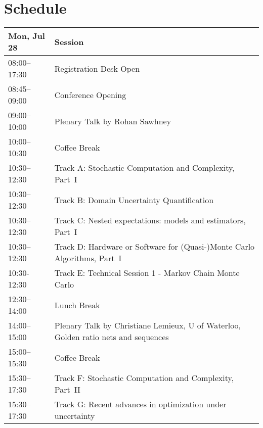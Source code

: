 \chapter{Schedule}
\begin{table}
{\footnotesize
\begin{tabularx}{\textwidth}{>{\hsize=0.32\hsize}X|>{\hsize=1.7\hsize}X}
\hline
\textbf{Mon, Jul 28} & \textbf{Session} \\
\hline
\cellcolor{\EmptyColor}08:00–17:30 & \cellcolor{\EmptyColor}Registration Desk Open \\
\cellcolor{\PlenaryColor}08:45–09:00 & \cellcolor{\PlenaryColor}Conference Opening \\
\cellcolor{\PlenaryColor}09:00–10:00 & \cellcolor{\PlenaryColor}Plenary Talk by Rohan Sawhney \\
\cellcolor{\EmptyColor}10:00–10:30 & \cellcolor{\EmptyColor}Coffee Break \\
\cellcolor{\SessionTitleColor}10:30–12:30 & \cellcolor{\SessionTitleColor}Track A: Stochastic Computation and Complexity, Part~I \\
\cellcolor{\SessionTitleColor}10:30–12:30 & \cellcolor{\SessionTitleColor}Track B: Domain Uncertainty Quantification \\
\cellcolor{\SessionTitleColor}10:30–12:30 & \cellcolor{\SessionTitleColor}Track C: Nested expectations: models and estimators, Part~I \\
\cellcolor{\SessionTitleColor}10:30–12:30 & \cellcolor{\SessionTitleColor}Track D: Hardware or Software for (Quasi-)Monte Carlo Algorithms, Part~I \\
\cellcolor{\SessionLightColor}10:30-12:30 & \cellcolor{\SessionLightColor}Track E: Technical Session 1 - Markov Chain Monte Carlo \\
\cellcolor{\EmptyColor}12:30–14:00 & \cellcolor{\EmptyColor}Lunch Break \\
\cellcolor{\PlenaryColor}14:00–15:00 & \cellcolor{\PlenaryColor}Plenary Talk by Christiane Lemieux, U of Waterloo, Golden ratio nets and sequences \\
\cellcolor{\EmptyColor}15:00–15:30 & \cellcolor{\EmptyColor}Coffee Break \\
\cellcolor{\SessionTitleColor}15:30–17:30 & \cellcolor{\SessionTitleColor}Track F: Stochastic Computation and Complexity, Part~II \\
\cellcolor{\SessionTitleColor}15:30–17:30 & \cellcolor{\SessionTitleColor}Track G: Recent advances in optimization under uncertainty \\

\end{tabularx}}
\end{table}
